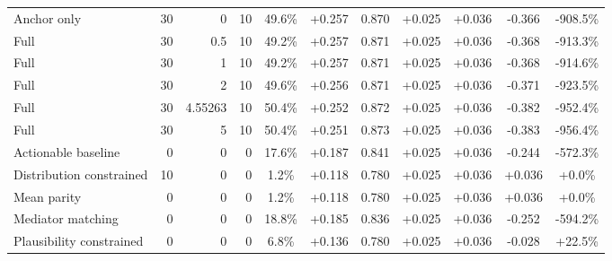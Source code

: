 \begin{table}[htbp]
\begin{tabular}{lrrrccccccc}
Anchor only & 30 & 0 & 10 & 49.6\% & +0.257 & 0.870 & +0.025 & +0.036 & -0.366 & -908.5\% \\
Full & 30 & 0.5 & 10 & 49.2\% & +0.257 & 0.871 & +0.025 & +0.036 & -0.368 & -913.3\% \\
Full & 30 & 1 & 10 & 49.2\% & +0.257 & 0.871 & +0.025 & +0.036 & -0.368 & -914.6\% \\
Full & 30 & 2 & 10 & 49.6\% & +0.256 & 0.871 & +0.025 & +0.036 & -0.371 & -923.5\% \\
Full & 30 & 4.55263 & 10 & 50.4\% & +0.252 & 0.872 & +0.025 & +0.036 & -0.382 & -952.4\% \\
Full & 30 & 5 & 10 & 50.4\% & +0.251 & 0.873 & +0.025 & +0.036 & -0.383 & -956.4\% \\
Actionable baseline & 0 & 0 & 0 & 17.6\% & +0.187 & 0.841 & +0.025 & +0.036 & -0.244 & -572.3\% \\
Distribution constrained & 10 & 0 & 0 & 1.2\% & +0.118 & 0.780 & +0.025 & +0.036 & +0.036 & +0.0\% \\
Mean parity & 0 & 0 & 0 & 1.2\% & +0.118 & 0.780 & +0.025 & +0.036 & +0.036 & +0.0\% \\
Mediator matching & 0 & 0 & 0 & 18.8\% & +0.185 & 0.836 & +0.025 & +0.036 & -0.252 & -594.2\% \\
Plausibility constrained & 0 & 0 & 0 & 6.8\% & +0.136 & 0.780 & +0.025 & +0.036 & -0.028 & +22.5\% \\
\bottomrule
\end{tabular}
\end{table}